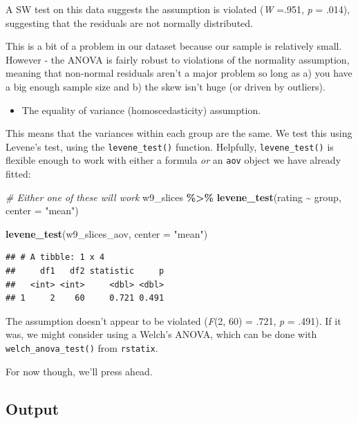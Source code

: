 \documentclass[
]{book}
\newenvironment{Shaded}{\begin{snugshade}}{\end{snugshade}}
\newcommand{\AttributeTok}[1]{\textcolor[rgb]{0.13,0.29,0.53}{#1}}
\newcommand{\CommentTok}[1]{\textcolor[rgb]{0.56,0.35,0.01}{\textit{#1}}}
\newcommand{\FunctionTok}[1]{\textcolor[rgb]{0.13,0.29,0.53}{\textbf{#1}}}
\newcommand{\NormalTok}[1]{#1}
\newcommand{\SpecialCharTok}[1]{\textcolor[rgb]{0.81,0.36,0.00}{\textbf{#1}}}
\newcommand{\StringTok}[1]{\textcolor[rgb]{0.31,0.60,0.02}{#1}}
\providecommand{\tightlist}{%
  \setlength{\itemsep}{0pt}\setlength{\parskip}{0pt}}
\begin{document}
A SW test on this data suggests the assumption is violated (\emph{W} =.951, \emph{p} =
.014), suggesting that the residuals are not normally distributed.

This is a bit of a problem in our dataset because our sample is relatively small. However - the ANOVA is fairly robust to violations of the normality assumption, meaning that non-normal residuals aren't a major problem so long as a) you have a big enough sample size and b) the skew isn't huge (or driven by outliers).

\begin{itemize}
\tightlist
\item
  The equality of variance (homoscedasticity) assumption.
\end{itemize}

This means that the variances within each group are the same. We test this using Levene's test, using the \texttt{levene\_test()} function. Helpfully, \texttt{levene\_test()} is flexible enough to work with either a formula \emph{or} an \texttt{aov} object we have already fitted:

\begin{Shaded}
\begin{Highlighting}[]
\CommentTok{\# Either one of these will work}
\NormalTok{w9\_slices }\SpecialCharTok{\%\textgreater{}\%}
  \FunctionTok{levene\_test}\NormalTok{(rating }\SpecialCharTok{\textasciitilde{}}\NormalTok{ group, }\AttributeTok{center =} \StringTok{"mean"}\NormalTok{)}

\FunctionTok{levene\_test}\NormalTok{(w9\_slices\_aov, }\AttributeTok{center =} \StringTok{"mean"}\NormalTok{)}
\end{Highlighting}
\end{Shaded}

\begin{verbatim}
## # A tibble: 1 x 4
##     df1   df2 statistic     p
##   <int> <int>     <dbl> <dbl>
## 1     2    60     0.721 0.491
\end{verbatim}

The assumption doesn't appear to be violated (\emph{F}(2, 60) = .721, \emph{p} = .491). If it was, we
might consider using a Welch's ANOVA, which can be done with \texttt{welch\_anova\_test()} from \texttt{rstatix}.

For now though, we'll press ahead.

\subsection{Output}\label{output-5}
\end{document}
